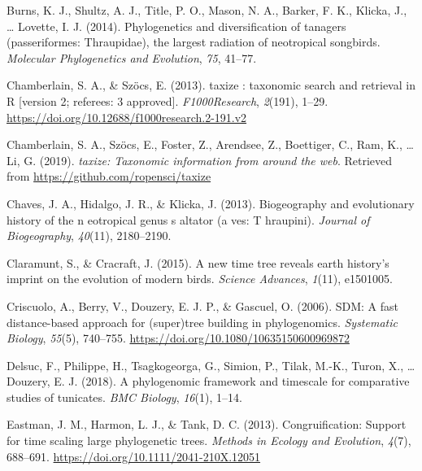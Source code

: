 \documentclass[
  man]{apa6}
\newlength{\cslhangindent}
\newlength{\cslentryspacingunit} %
\newenvironment{CSLReferences}[2] %
 {%
  \setlength{\parindent}{0pt}
  \ifodd #1
  \let\oldpar\par
  \def\par{\hangindent=\cslhangindent\oldpar}
  \fi
  \setlength{\parskip}{#2\cslentryspacingunit}
 }%
 {}
\begin{document}
\begin{CSLReferences}{1}{0}
\leavevmode{}%
Burns, K. J., Shultz, A. J., Title, P. O., Mason, N. A., Barker, F. K., Klicka, J., \ldots{} Lovette, I. J. (2014). Phylogenetics and diversification of tanagers (passeriformes: Thraupidae), the largest radiation of neotropical songbirds. \emph{{Molecular Phylogenetics and Evolution}}, \emph{75}, 41--77.

\leavevmode{}%
Chamberlain, S. A., \& Szöcs, E. (2013). {taxize : taxonomic search and retrieval in R {[}version 2; referees: 3 approved{]}}. \emph{{F1000Research}}, \emph{2}(191), 1--29. \url{https://doi.org/10.12688/f1000research.2-191.v2}

\leavevmode{}%
Chamberlain, S. A., Szöcs, E., Foster, Z., Arendsee, Z., Boettiger, C., Ram, K., \ldots{} Li, G. (2019). \emph{{taxize: Taxonomic information from around the web}}. Retrieved from \url{https://github.com/ropensci/taxize}

\leavevmode{}%
Chaves, J. A., Hidalgo, J. R., \& Klicka, J. (2013). Biogeography and evolutionary history of the n eotropical genus s altator (a ves: T hraupini). \emph{Journal of Biogeography}, \emph{40}(11), 2180--2190.

\leavevmode{}%
Claramunt, S., \& Cracraft, J. (2015). A new time tree reveals earth history's imprint on the evolution of modern birds. \emph{{Science Advances}}, \emph{1}(11), e1501005.

\leavevmode{}%
Criscuolo, A., Berry, V., Douzery, E. J. P., \& Gascuel, O. (2006). {SDM: A fast distance-based approach for (super)tree building in phylogenomics}. \emph{{Systematic Biology}}, \emph{55}(5), 740--755. \url{https://doi.org/10.1080/10635150600969872}

\leavevmode{}%
Delsuc, F., Philippe, H., Tsagkogeorga, G., Simion, P., Tilak, M.-K., Turon, X., \ldots{} Douzery, E. J. (2018). A phylogenomic framework and timescale for comparative studies of tunicates. \emph{BMC Biology}, \emph{16}(1), 1--14.

\leavevmode{}%
Eastman, J. M., Harmon, L. J., \& Tank, D. C. (2013). {Congruification: Support for time scaling large phylogenetic trees}. \emph{{Methods in Ecology and Evolution}}, \emph{4}(7), 688--691. \url{https://doi.org/10.1111/2041-210X.12051}


\end{CSLReferences}
\end{document}
